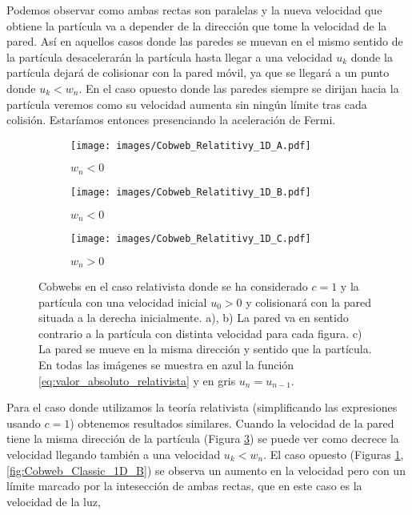 Podemos observar como ambas rectas son paralelas y la nueva velocidad que obtiene la partícula va a depender de la dirección que tome la velocidad de la pared. Así en aquellos casos donde las paredes se muevan en el mismo sentido de la partícula desacelerarán la partícula hasta llegar a una velocidad \( u_k \) donde la partícula dejará de colisionar con la pared móvil, ya que se llegará a un punto donde \( u_k < w_n \). En el caso opuesto donde las paredes siempre se dirijan hacia la partícula veremos como su velocidad aumenta sin ningún límite tras cada colisión. Estaríamos entonces presenciando la aceleración de Fermi.

\vspace{3mm}

\begin{figure}[H]
    \centering
    \begin{subfigure}[b]{0.3\textwidth}
        \centering
        \texttt{[image: images/Cobweb\_Relatitivy\_1D\_A.pdf]}
        \caption{$w_n<0$}
        \label{fig:Cobweb_Rel_1D_A}
    \end{subfigure}
    \hfill
    \begin{subfigure}[b]{0.3\textwidth}
        \centering
        \texttt{[image: images/Cobweb\_Relatitivy\_1D\_B.pdf]}
        \caption{$w_n<0$}
        \label{fig:Cobweb_Rel_1D_B}
    \end{subfigure}
    \hfill
    \begin{subfigure}[b]{0.3\textwidth}
        \centering
        \texttt{[image: images/Cobweb\_Relatitivy\_1D\_C.pdf]}
        \caption{$w_n>0$}
        \label{fig:Cobweb_Rel_1D_C}
    \end{subfigure}
    \caption{Cobwebs en el caso relativista donde se ha considerado \( c=1 \) y la partícula  con una velocidad inicial $u_0 > 0$ y colisionará con la pared situada a la derecha inicialmente. a), b) La pared va en sentido contrario a la partícula con distinta velocidad para cada figura. c) La pared se mueve en la misma dirección y sentido que la partícula. En todas las imágenes se muestra en azul la función \ref{eq:valor_absoluto_relativista} y en gris \( u_n = u_{n-1} \).}
        \label{fig:Cobweb_Rel_1D}
\end{figure}

Para el caso donde utilizamos la teoría relativista (simplificando las expresiones usando \( c = 1\)) obtenemos resultados similares. Cuando la velocidad de la pared tiene la misma dirección de la partícula (Figura \ref{fig:Cobweb_Rel_1D_C}) se puede ver como decrece la velocidad llegando también a una velocidad \( u_k < w_n \). El caso opuesto (Figuras \ref{fig:Cobweb_Rel_1D_A}, \ref{fig:Cobweb_Classic_1D_B}) se observa un aumento en la velocidad pero con un límite marcado por la intesección de ambas rectas, que en este caso es la velocidad de la luz,

